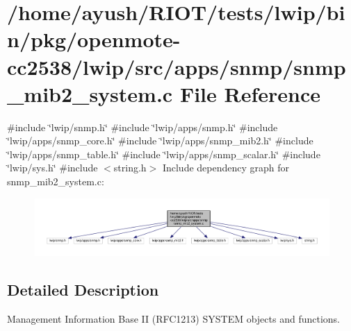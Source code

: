 \hypertarget{openmote-cc2538_2lwip_2src_2apps_2snmp_2snmp__mib2__system_8c}{}\section{/home/ayush/\+R\+I\+O\+T/tests/lwip/bin/pkg/openmote-\/cc2538/lwip/src/apps/snmp/snmp\+\_\+mib2\+\_\+system.c File Reference}
\label{openmote-cc2538_2lwip_2src_2apps_2snmp_2snmp__mib2__system_8c}
{\ttfamily \#include \char`\"{}lwip/snmp.\+h\char`\"{}}\newline
{\ttfamily \#include \char`\"{}lwip/apps/snmp.\+h\char`\"{}}\newline
{\ttfamily \#include \char`\"{}lwip/apps/snmp\+\_\+core.\+h\char`\"{}}\newline
{\ttfamily \#include \char`\"{}lwip/apps/snmp\+\_\+mib2.\+h\char`\"{}}\newline
{\ttfamily \#include \char`\"{}lwip/apps/snmp\+\_\+table.\+h\char`\"{}}\newline
{\ttfamily \#include \char`\"{}lwip/apps/snmp\+\_\+scalar.\+h\char`\"{}}\newline
{\ttfamily \#include \char`\"{}lwip/sys.\+h\char`\"{}}\newline
{\ttfamily \#include $<$string.\+h$>$}\newline
Include dependency graph for snmp\+\_\+mib2\+\_\+system.\+c\+:
\nopagebreak
\begin{figure}[H]
\begin{center}
\leavevmode
\includegraphics[width=350pt]{openmote-cc2538_2lwip_2src_2apps_2snmp_2snmp__mib2__system_8c__incl}
\end{center}
\end{figure}


\subsection{Detailed Description}
Management Information Base II (R\+F\+C1213) S\+Y\+S\+T\+EM objects and functions. 
